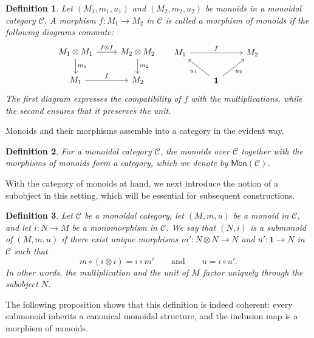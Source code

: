 \documentclass{amsart}
\newtheorem{definition}{Definition}[section]
\begin{document}
\begin{definition}\label{def:monoid_morphism}
Let $(M_1,m_1,u_1)$ and $(M_2,m_2,u_2)$ be monoids in a monoidal category $\mathcal{C}$. A morphism $f \colon M_1 \longrightarrow M_2$ in $\mathcal{C}$ is called a morphism of monoids if the following diagrams commute:
\[
\begin{tikzcd}
M_1\otimes M_1\arrow{r}{f\otimes f}\arrow{d}{m_1} & M_2\otimes M_2\arrow{d}{m_2}\\
M_1\arrow{r}{f} & M_2
\end{tikzcd}
\;\;\;\;\;
\begin{tikzcd}
M_1\arrow{rr}{f}&&M_2\\
&\mathbf{1}\arrow{ul}{u_1}\arrow[swap]{ur}{u_2}
\end{tikzcd}
\]
The first diagram expresses the compatibility of $f$ with the multiplications, while the second ensures that it preserves the unit.
\end{definition}

Monoids and their morphisms assemble into a category in the evident way.

\begin{definition}\label{def:mon_category}
For a monoidal category $\mathcal{C}$, the monoids over $\mathcal{C}$ together with the morphisms of monoids form a category, which we denote by $\mathsf{Mon}(\mathcal{C})$.
\end{definition}

With the category of monoids at hand, we next introduce the notion of a subobject in this setting, which will be essential for subsequent constructions.

\begin{definition}\label{def:submonoid}
Let $\mathcal{C}$ be a monoidal category, let $(M,m,u)$ be a monoid in $\mathcal{C}$, and let $i \colon N \longrightarrow M$ be a monomorphism in $\mathcal{C}$. We say that $(N,i)$ is a submonoid of $(M,m,u)$ if there exist unique morphisms $m' \colon N\otimes N \longrightarrow N$ and $u' \colon \mathbf{1} \longrightarrow N$ in $\mathcal{C}$ such that
\[
m \circ (i \otimes i) = i \circ m' \qquad\text{and}\qquad u = i \circ u'.
\]
In other words, the multiplication and the unit of $M$ factor uniquely through the subobject $N$.
\end{definition}

The following proposition shows that this definition is indeed coherent: every submonoid inherits a canonical monoidal structure, and the inclusion map is a morphism of monoids.
\end{document}
